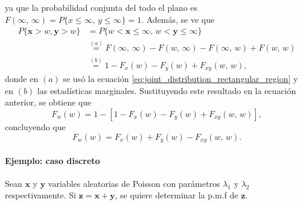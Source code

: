 \documentclass[a4paper]{report}
\newcommand{\x}{\mathbf{x}}
\newcommand{\y}{\mathbf{y}}
\newcommand{\z}{\mathbf{z}}
\begin{document}
ya que la probabilidad conjunta del todo el plano es \(F(\infty,\,\infty)=P\{x\leq\infty,\,y\leq\infty\}=1\). Además, se ve que
\begin{align*}
 P\{\x>w,\y>w\}&=P\{w<\x\leq \infty,\,w<\y\leq \infty\}\\
   &\overset{(a)}{=}F(\infty,\,\infty)-F(w,\,\infty)-F(\infty,\,w)+F(w,\,w)\\
   &\overset{(b)}{=}1-F_x(w)-F_y(w)+F_{xy}(w,\,w),
\end{align*}
donde en \((a)\) se usó la ecuación \ref{eq:joint_distribution_rectangular_region} y en \((b)\) las estadísticas marginales. Sustituyendo este resultado en la ecuación anterior, se obtiene que
\[
 F_w(w)=1-[1-F_x(w)-F_y(w)+F_{xy}(w,\,w)],
\]
concluyendo que
\begin{equation}\label{eq:joint_distribution_rv_min}
 F_w(w)=F_x(w)+F_y(w)-F_{xy}(w,\,w).
\end{equation}

\paragraph{Ejemplo: caso discreto} Sean \(\x\) y \(\y\) variables aleatorias de Poisson con parámetros \(\lambda_1\) y \(\lambda_2\) respectivamente. Si \(\z=\x+\y\), se quiere determinar la p.m.f de \(\z\).
\end{document}
